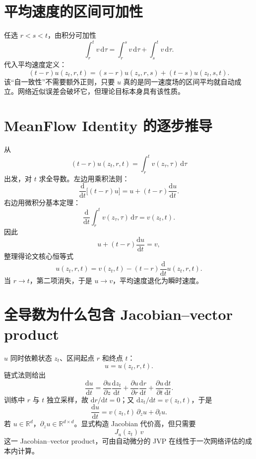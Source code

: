 \documentclass[UTF8,12pt,a4paper,fontset=none]{ctexart}
\numberwithin{equation}{section}
\newcommand{\R}{\mathbb{R}}
\newcommand{\dd}{\mathrm{d}}
\begin{document}
\section{平均速度的区间可加性}
任选 $r<s<t$，由积分可加性
\begin{equation}
 \int_r^t v\,\dd\tau=\int_r^s v\,\dd\tau+\int_s^t v\,\dd\tau.
\end{equation}
代入平均速度定义：
\begin{equation}
 \boxed{(t-r)u(z_t,r,t)
 =(s-r)u(z_s,r,s)+(t-s)u(z_t,s,t).}
\end{equation}
该“自一致性”不需要额外正则，只要 $u$ 真的是同一速度场的区间平均就自动成立。网络近似误差会破坏它，但理论目标本身具有该性质。

\section{MeanFlow Identity 的逐步推导}
从
\begin{equation}
 (t-r)u(z_t,r,t)=\int_r^t v(z_\tau,\tau)\,\dd\tau
\end{equation}
出发，对 $t$ 求全导数。左边用乘积法则：
\begin{equation}
 \frac{\dd}{\dd t}\big[(t-r)u\big]
 =u+(t-r)\frac{\dd u}{\dd t}.
\end{equation}
右边用微积分基本定理：
\begin{equation}
 \frac{\dd}{\dd t}\int_r^t v(z_\tau,\tau)\,\dd\tau=v(z_t,t).
\end{equation}
因此
\begin{equation}
 u+(t-r)\frac{\dd u}{\dd t}=v,
\end{equation}
整理得论文核心恒等式
\begin{equation}
 \boxed{u(z_t,r,t)=v(z_t,t)-(t-r)\frac{\dd}{\dd t}u(z_t,r,t).}
\end{equation}
当 $r\to t$，第二项消失，于是 $u\to v$，平均速度退化为瞬时速度。

\section{全导数为什么包含 Jacobian--vector product}
$u$ 同时依赖状态 $z_t$、区间起点 $r$ 和终点 $t$：
\begin{equation}
 u=u(z_t,r,t).
\end{equation}
链式法则给出
\begin{equation}
 \frac{\dd u}{\dd t}
 =\frac{\partial u}{\partial z}\frac{\dd z_t}{\dd t}
 +\frac{\partial u}{\partial r}\frac{\dd r}{\dd t}
 +\frac{\partial u}{\partial t}\frac{\dd t}{\dd t}.
\end{equation}
训练中 $r$ 与 $t$ 独立采样，故 $\dd r/\dd t=0$；又 $\dd z_t/\dd t=v(z_t,t)$，于是
\begin{equation}
 \boxed{\frac{\dd u}{\dd t}=v(z_t,t)\,\partial_z u+\partial_tu.}
\end{equation}
若 $u\in\R^d$，$\partial_z u\in\R^{d\times d}$。显式构造 Jacobian 代价高，但只需要
\begin{equation}
 J_u(z_t)\,v
\end{equation}
这一 Jacobian--vector product，可由自动微分的 JVP 在线性于一次网络评估的成本内计算。
\end{document}
